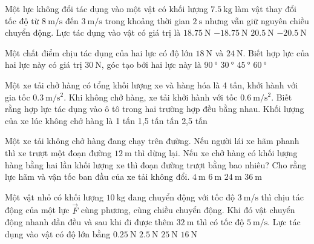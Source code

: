 \begin{ex}
	Một lực không đổi tác dụng vào một vật có khối lượng $\SI{7.5}{\kilogram}$ làm vật thay đổi tốc độ từ $\SI{8}{\meter/\second}$ đến $\SI{3}{\meter/\second}$ trong khoảng thời gian $\SI{2}{\second}$ nhưng vẫn giữ nguyên chiều chuyển động. Lực tác dụng vào vật có giá trị là
	\choice
	{$\SI{18.75}{\newton}$}
	{\True $\SI{-18.75}{\newton}$}
	{$\SI{20.5}{\newton}$}
	{$\SI{-20.5}{\newton}$}
	\loigiai{}
\end{ex}
\begin{ex}
	Một chất điểm chịu tác dụng của hai lực có độ lớn $\SI{18}{\newton}$ và $\SI{24}{\newton}$. Biết hợp lực của hai lực này có giá trị $\SI{30}{\newton}$, góc tạo bởi hai lực này là
	\choice
	{\True $\SI{90}{\degree}$}
	{$\SI{30}{\degree}$}
	{$\SI{45}{\degree}$}
	{$\SI{60}{\degree}$}
	\loigiai{}
\end{ex}
\begin{ex}
	Một xe tải chở hàng có tổng khối lượng xe và hàng hóa là 4 tấn, khởi hành với gia tốc $\SI{0.3}{\meter/\second^2}$. Khi không chở hàng, xe tải khởi hành với tốc $\SI{0.6}{\meter/\second^2}$. Biết rằng hợp lực tác dụng vào ô tô trong hai trường hợp đều bằng nhau. Khối lượng của xe lúc không chở hàng là
	\choice
	{1 tấn}
	{1,5 tấn}
	{ tấn}
	{2,5 tấn}
	\loigiai{}
\end{ex}
\begin{ex}
	Một xe tải không chở hàng đang chạy trên đường. Nếu người lái xe hãm phanh thì xe trượt một đoạn đường $\SI{12}{\meter}$ thì dừng lại. Nếu xe chở hàng có khối lượng hàng bằng hai lần khối lượng xe thì đoạn đường trượt bằng bao nhiêu? Cho rằng lực hãm và vận tốc ban đầu của xe tải không đổi.
	\choice
	{$\SI{4}{\meter}$}
	{$\SI{6}{\meter}$}
	{$\SI{24}{\meter}$}
	{\True $\SI{36}{\meter}$}
	\loigiai{}
\end{ex}
\begin{ex}
	Một vật nhỏ có khối lượng $\SI{10}{\kilogram}$ đang chuyển động với tốc độ $\SI{3}{\meter/\second}$ thì chịu tác động của một lực $\vec{F}$ cùng phương, cùng chiều chuyển động. Khi đó vật chuyển động nhanh dần đều và sau khi đi được thêm $\SI{32}{\meter}$ thì có tốc độ $\SI{5}{\meter/\second}$. Lực tác dụng vào vật có độ lớn bằng
	\choice
	{$\SI{0.25}{\newton}$}
	{\True $\SI{2.5}{\newton}$}
	{$\SI{25}{\newton}$}
	{$\SI{16}{\newton}$}
	\loigiai{}
\end{ex}
